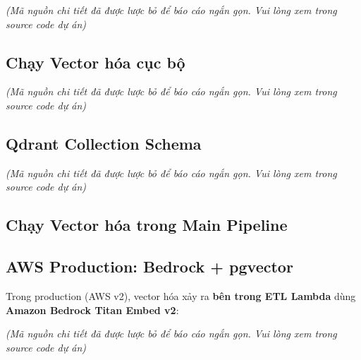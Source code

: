 \emph{(Mã nguồn chi tiết đã được lược bỏ để báo cáo ngắn gọn. Vui lòng
xem trong source code dự án)}

\hypertarget{chux1ea1y-vector-huxf3a-cux1ee5c-bux1ed9}{%
\subsection{Chạy Vector hóa cục
bộ}}

\emph{(Mã nguồn chi tiết đã được lược bỏ để báo cáo ngắn gọn. Vui lòng
xem trong source code dự án)}

\hypertarget{qdrant-collection-schema}{%
\subsection{Qdrant Collection Schema}}

\emph{(Mã nguồn chi tiết đã được lược bỏ để báo cáo ngắn gọn. Vui lòng
xem trong source code dự án)}

\hypertarget{chux1ea1y-vector-huxf3a-trong-main-pipeline}{%
\subsection{Chạy Vector hóa trong Main
Pipeline}}

\begin{Shaded}
\begin{Highlighting}[]

\end{Highlighting}
\end{Shaded}

\hypertarget{aws-production-bedrock-pgvector}{%
\subsection{AWS Production: Bedrock +
pgvector}}

Trong production (AWS v2), vector hóa xảy ra \textbf{bên trong ETL
Lambda} dùng \textbf{Amazon Bedrock Titan Embed v2}:

\emph{(Mã nguồn chi tiết đã được lược bỏ để báo cáo ngắn gọn. Vui lòng
xem trong source code dự án)}

